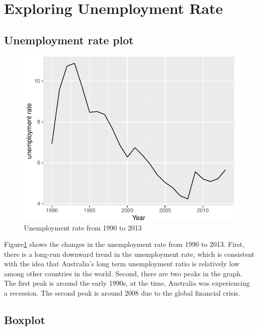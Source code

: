 \documentclass[11pt,a4paper,]{article}
\begin{document}
\section{Exploring Unemployment Rate}

\subsection{Unemployment rate plot}

\begin{figure}[H]

{\centering \includegraphics{Figures/unemp-1} 

}

\caption{Unemployment rate from 1990 to 2013}\label{fig:unemp}
\end{figure}

Figure\ref{fig:unemp} shows the changes in the unemployment rate from 1990 to 2013. First, there is a long-run downward trend in the unemployment rate, which is consistent with the idea that Australia's long term unemployment ratio is relatively low among other countries in the world. Second, there are two peaks in the graph. The first peak is around the early 1990s, at the time, Australia was experiencing a recession. The second peak is around 2008 due to the global financial crisis.

\subsection{Boxplot}
\end{document}
